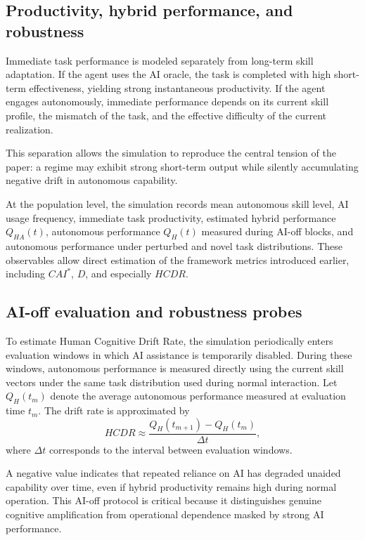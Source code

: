 \documentclass[11pt,a4paper]{article}
\begin{document}
\subsection{Productivity, hybrid performance, and robustness}

Immediate task performance is modeled separately from long-term skill adaptation. If the agent uses the AI oracle, the task is completed with high short-term effectiveness, yielding strong instantaneous productivity. If the agent engages autonomously, immediate performance depends on its current skill profile, the mismatch of the task, and the effective difficulty of the current realization.

This separation allows the simulation to reproduce the central tension of the paper: a regime may exhibit strong short-term output while silently accumulating negative drift in autonomous capability.

At the population level, the simulation records mean autonomous skill level, AI usage frequency, immediate task productivity, estimated hybrid performance $Q_{HA}(t)$, autonomous performance $Q_H(t)$ measured during AI-off blocks, and autonomous performance under perturbed and novel task distributions. These observables allow direct estimation of the framework metrics introduced earlier, including $CAI^*$, $D$, and especially $HCDR$.

\subsection{AI-off evaluation and robustness probes}

To estimate Human Cognitive Drift Rate, the simulation periodically enters evaluation windows in which AI assistance is temporarily disabled. During these windows, autonomous performance is measured directly using the current skill vectors under the same task distribution used during normal interaction. Let $Q_H(t_m)$ denote the average autonomous performance measured at evaluation time $t_m$. The drift rate is approximated by
\[
HCDR \approx \frac{Q_H(t_{m+1}) - Q_H(t_m)}{\Delta t},
\]
where $\Delta t$ corresponds to the interval between evaluation windows.

A negative value indicates that repeated reliance on AI has degraded unaided capability over time, even if hybrid productivity remains high during normal operation. This AI-off protocol is critical because it distinguishes genuine cognitive amplification from operational dependence masked by strong AI performance.
\end{document}
